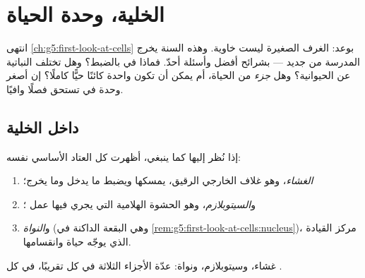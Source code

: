 \chapter{الخلية، وحدة الحياة}\label{ch:g6:cell-unit-of-life}

انتهى \cref{ch:g5:first-look-at-cells} بوعد: الغرف الصغيرة ليست
خاوية. وهذه السنة يخرج  المدرسة من جديد --- بشرائح أفضل
وأسئلة أحدّ. فماذا في  بالضبط؟ وهل تختلف  النباتية عن
الحيوانية؟ وهل  \emph{جزء} من الحياة، أم يمكن أن تكون 
واحدة كائنًا حيًّا كاملًا؟ إن أصغر وحدة في  تستحق فصلًا
وافيًا.

\section{داخل الخلية}

\begin{definition}\label{def:g6:cell-unit-of-life:parts}
إذا نُظر إليها كما ينبغي، أظهرت كل  العتاد الأساسي نفسه:
\begin{enumerate}
  \item \emph{الغشاء}، وهو غلاف  الخارجي
        الرقيق، يمسكها ويضبط ما يدخل وما يخرج؛
  \item و\emph{السيتوبلازم}، وهو الحشوة الهلامية
        التي يجري فيها عمل ؛
  \item و\emph{النواة}
        (وهي البقعة الداكنة في
        \cref{rem:g5:first-look-at-cells:nucleus})، مركز القيادة
        الذي يوجّه حياة  وانقسامها.
\end{enumerate}
غشاء، وسيتوبلازم، ونواة: عدّة الأجزاء الثلاثة في كل  تقريبًا،
في كل   .
\end{definition}

